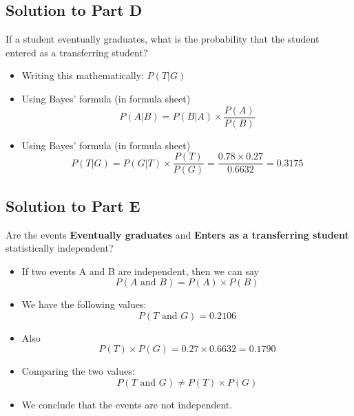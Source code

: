 \documentclass[a4paper,12pt]{article}
\begin{document}
\subsection*{Solution to Part D}
\noindent If a student eventually graduates, what is the probability that the student entered
as a transferring student?
\begin{itemize}
	\item Writing this mathematically: $P(T|G)$
	\item Using Bayes' formula (in formula sheet)
	\[P(A|B)=  {P(B|A)\times \frac{P(A)}{ P(B)}} \]
	\item Using Bayes' formula (in formula sheet)
	\[P(T|G)=  {P(G|T)\times \frac{P(T)}{P(G)}} = \frac{0.78 \times 0.27}{0.6632} = 0.3175 \]
\end{itemize}

\subsection*{Solution to Part E}
\noindent Are the events \textbf{Eventually graduates} and \textbf{Enters as a transferring student}
statistically independent?

\begin{itemize}
	\item If two events A and B are independent, then we can say
	\[P(A \mbox{ and } B) = P(A) \times P(B)\] 
	\item We have the following values:
	\[P(T \mbox{ and } G) = 0.2106\]
	\item Also
	\[P(T) \times P(G) = 0.27 \times 0.6632 = 0.1790\]
	\item Comparing the two values:
	\[P(T \mbox{ and } G) \neq P(T) \times P(G)\] 
	\item We conclude that the events are not independent.
\end{itemize}

			
	
\end{document}

